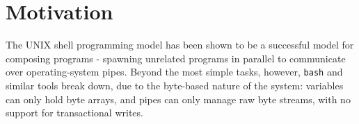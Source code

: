 \documentclass[sigplan,10pt,nosumlimits]{acmart}
\begin{document}
\begin{abstract}
%
%
%
\end{abstract}
\maketitle

\section{Motivation}

The UNIX shell programming model has been shown to be a successful model for composing programs - spawning unrelated programs in parallel to communicate over operating-system pipes. Beyond the most simple tasks, however, \verb/bash/ and similar tools break down, due to the byte-based nature of the system: variables can only hold byte arrays, and pipes can only manage raw byte streams, with no support for transactional writes.
\end{document}
